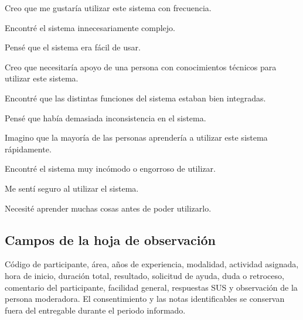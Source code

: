 \begin{uxpreg}
  \item Creo que me gustaría utilizar este sistema con frecuencia.
  \item Encontré el sistema innecesariamente complejo.
  \item Pensé que el sistema era fácil de usar.
  \item Creo que necesitaría apoyo de una persona con conocimientos técnicos para utilizar este sistema.
  \item Encontré que las distintas funciones del sistema estaban bien integradas.
  \item Pensé que había demasiada inconsistencia en el sistema.
  \item Imagino que la mayoría de las personas aprendería a utilizar este sistema rápidamente.
  \item Encontré el sistema muy incómodo o engorroso de utilizar.
  \item Me sentí seguro al utilizar el sistema.
  \item Necesité aprender muchas cosas antes de poder utilizarlo.
\end{uxpreg}

\subsection{Campos de la hoja de observación}

Código de participante, área, años de experiencia, modalidad, actividad asignada, hora de inicio,
duración total, resultado, solicitud de ayuda, duda o retroceso, comentario del participante,
facilidad general, respuestas SUS y observación de la persona moderadora. El consentimiento y las
notas identificables se conservan fuera del entregable durante el periodo informado.
